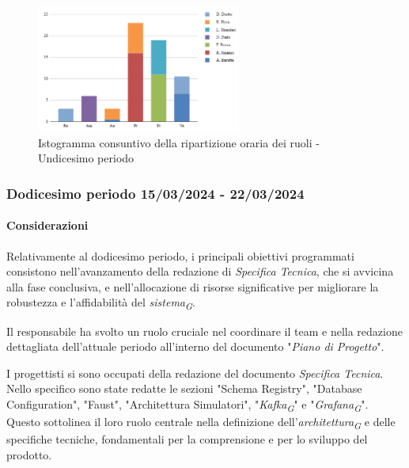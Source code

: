 \begin{figure}[H]
    \centering
    \includegraphics[width=0.6\textwidth]{../Images/consuntivoDivisioneRuoli11Periodo.png}
    \caption{Istogramma consuntivo della ripartizione oraria dei ruoli - Undicesimo periodo}
    \label{fig:Consuntivo_ripartizione_oraria_11}
\end{figure}


\subsubsection{Dodicesimo periodo  15/03/2024 - 22/03/2024}

\paragraph{Considerazioni}
Relativamente al dodicesimo periodo, i principali obiettivi programmati consistono nell'avanzamento della redazione di \textit{Specifica Tecnica}, che si avvicina alla fase conclusiva, e nell'allocazione di risorse significative per migliorare la robustezza e l'affidabilità del \textit{sistema}\textsubscript{\textit{G}}.

Il responsabile ha svolto un ruolo cruciale nel coordinare il team e nella redazione dettagliata dell'attuale periodo all'interno del documento "\textit{Piano di Progetto}".

I progettisti si sono occupati della redazione del documento \textit{Specifica Tecnica}. Nello specifico sono state redatte le sezioni "Schema Registry", "Database Configuration", "Faust", "Architettura Simulatori", "\textit{Kafka}\textsubscript{\textit{G}}" e "\textit{Grafana}\textsubscript{\textit{G}}". Questo sottolinea il loro ruolo centrale nella definizione dell'\textit{architettura}\textsubscript{\textit{G}} e delle specifiche tecniche, fondamentali per la comprensione e per lo sviluppo del prodotto.

